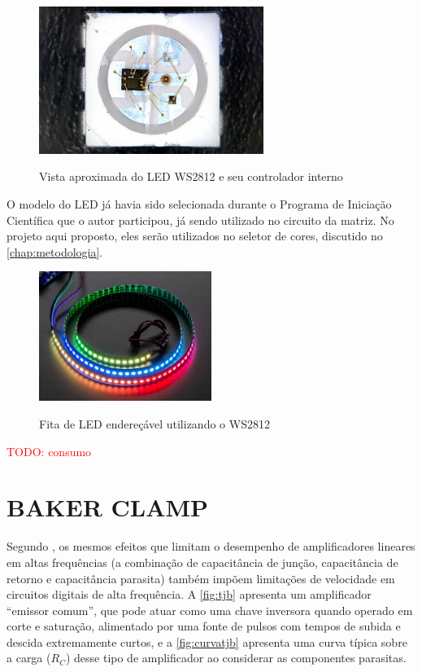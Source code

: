 \begin{figure}[!htb]
    \centering
    \caption{Vista aproximada do LED WS2812 e seu controlador interno}
    \includegraphics[width=0.65\textwidth]{./dados/figuras/ws2812}
    \label{fig:ws2812}
\end{figure}

O modelo do LED já havia sido selecionada durante o Programa de Iniciação Científica que o autor participou, já sendo utilizado no circuito da matriz. No projeto aqui proposto, eles serão utilizados no seletor de cores, discutido no \autoref{chap:metodologia}.

\begin{figure}[H]
    \centering
    \caption{Fita de LED endereçável utilizando o WS2812}
    \includegraphics[width=0.5\textwidth]{./dados/figuras/strip}
    \label{fig:strip}
\end{figure}

\textcolor{red}{TODO: consumo}

\section{BAKER CLAMP}
\label{sec:backerclamp}

Segundo , os mesmos efeitos que limitam o desempenho de amplificadores lineares em altas frequências (a combinação de capacitância de junção, capacitância de retorno e capacitância parasita) também impõem limitações de velocidade em circuitos digitais de alta frequência. A \autoref{fig:tjb} apresenta um amplificador ``emissor comum'', que pode atuar como uma chave inversora quando operado em corte e saturação, alimentado por uma fonte de pulsos com tempos de subida e descida extremamente curtos, e a \autoref{fig:curvatjb} apresenta uma curva típica sobre a carga ($R_{C}$) desse tipo de amplificador ao considerar as componentes parasitas. 

